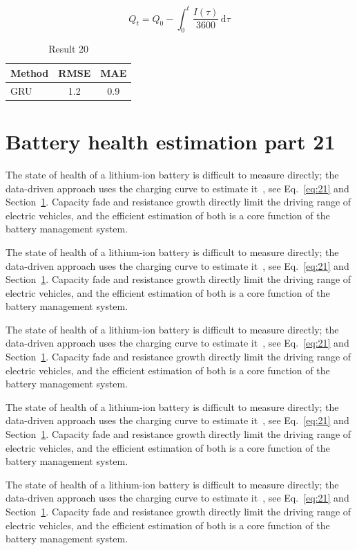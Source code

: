 \documentclass[11pt]{article}
\begin{document}
\begin{equation}\label{eq:20}
  Q_t = Q_0 - \int_0^t \frac{I(\tau)}{3600}\,\mathrm{d}\tau
\end{equation}
\begin{table}[h]\centering\begin{tabular}{lcc}\toprule Method & RMSE & MAE\\\midrule GRU & 1.2 & 0.9\\\bottomrule\end{tabular}\caption{Result 20}\end{table}

\section{Battery health estimation part 21}\label{sec:21}
The state of health of a lithium-ion battery is difficult to measure directly; the data-driven approach uses the charging curve to estimate it~\cite{a2020}, see Eq.~\eqref{eq:21} and Section~\ref{sec:21}. Capacity fade and resistance growth directly limit the driving range of electric vehicles, and the efficient estimation of both is a core function of the battery management system.

The state of health of a lithium-ion battery is difficult to measure directly; the data-driven approach uses the charging curve to estimate it~\cite{a2020}, see Eq.~\eqref{eq:21} and Section~\ref{sec:21}. Capacity fade and resistance growth directly limit the driving range of electric vehicles, and the efficient estimation of both is a core function of the battery management system.

The state of health of a lithium-ion battery is difficult to measure directly; the data-driven approach uses the charging curve to estimate it~\cite{a2020}, see Eq.~\eqref{eq:21} and Section~\ref{sec:21}. Capacity fade and resistance growth directly limit the driving range of electric vehicles, and the efficient estimation of both is a core function of the battery management system.

The state of health of a lithium-ion battery is difficult to measure directly; the data-driven approach uses the charging curve to estimate it~\cite{a2020}, see Eq.~\eqref{eq:21} and Section~\ref{sec:21}. Capacity fade and resistance growth directly limit the driving range of electric vehicles, and the efficient estimation of both is a core function of the battery management system.

The state of health of a lithium-ion battery is difficult to measure directly; the data-driven approach uses the charging curve to estimate it~\cite{a2020}, see Eq.~\eqref{eq:21} and Section~\ref{sec:21}. Capacity fade and resistance growth directly limit the driving range of electric vehicles, and the efficient estimation of both is a core function of the battery management system.
\end{document}
